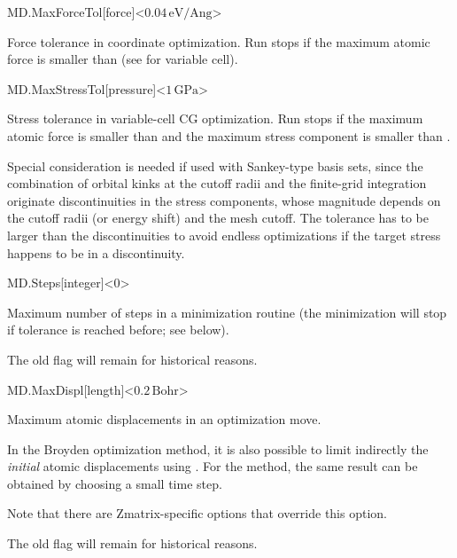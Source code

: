\begin{fdfentry}{MD.MaxForceTol}[force]<$0.04\,\mathrm{eV/Ang}$>
  
  Force tolerance in coordinate optimization.
  Run stops if the maximum atomic force is
  smaller than  (see 
  for variable cell).

\end{fdfentry}

\begin{fdfentry}{MD.MaxStressTol}[pressure]<$1\,\mathrm{GPa}$>
  
  Stress tolerance in variable-cell CG optimization. Run stops if the
  maximum atomic force is smaller than  and the
  maximum stress component is smaller than .

  Special consideration is needed if used with Sankey-type basis sets,
  since the combination of orbital kinks at the cutoff radii and the
  finite-grid integration originate discontinuities in the stress
  components, whose magnitude depends on the cutoff radii (or energy
  shift) and the mesh cutoff. The tolerance has to be larger than the
  discontinuities to avoid endless optimizations if the target stress
  happens to be in a discontinuity.

\end{fdfentry}

\begin{fdfentry}{MD.Steps}[integer]<0>
  
  Maximum number of steps in a minimization routine
  (the minimization will stop if tolerance is reached before; see
   below).

  \note The old flag  will remain for historical
  reasons.

\end{fdfentry}

\begin{fdfentry}{MD.MaxDispl}[length]<$0.2\,\mathrm{Bohr}$>
  
  Maximum atomic displacements in an optimization move.

  In the Broyden optimization method, it is also possible to limit
  indirectly the \textit{initial\/} atomic displacements using
  . For the  method, the
  same result can be obtained by choosing a small time step.

  Note that there are Zmatrix-specific options that override this option.

  \note The old flag  will remain for historical
  reasons.

\end{fdfentry}

